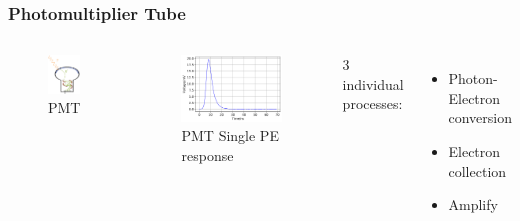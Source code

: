 \documentclass{beamer}
\begin{document}
\begin{frame}
\frametitle{Photomultiplier Tube}
\setlength{\abovecaptionskip}{0mm}
\setlength{\belowcaptionskip}{0mm}
\begin{columns}
\begin{figure}
    \centering
    \caption{PMT}
    \includegraphics[width=0.3\linewidth]{img/PMT.png}
\end{figure}
\begin{figure}
    \centering
    \caption{PMT Single PE response}
    \includegraphics[width=0.9\linewidth]{img/pmtspe.png}
\end{figure}
\begin{center}
    3 individual processes:
\end{center}
\begin{itemize}
    \item Photon-Electron conversion
    \item Electron collection
    \item Amplify
\end{itemize}
\end{columns}
\end{frame}
\end{document}
